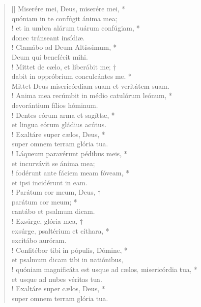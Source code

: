 \begin{verse}[\versewidth]
Miserére mei, Deus, miserére mei, *\\
quóniam in te confúgit ánima mea;\\!
\vin et in umbra alárum tuárum confúgiam, *\\
\vin donec tránseant insídiæ.\\!
Clamábo ad Deum Altíssimum, *\\
Deum qui benefécit mihi.\\!
\vin Mittet de cælo, et liberábit me; †\\
\vin dabit in oppróbrium conculcántes me. *\\
\vin Mittet Deus misericórdiam suam et veritátem suam.\\!
Anima mea recúmbit in médio catulórum leónum, *\\
devorántium fílios hóminum.\\!
\vin Dentes eórum arma et sagíttæ, *\\
\vin et lingua eórum gládius acútus.\\!
Exaltáre super cælos, Deus, *\\
super omnem terram glória tua.\\!
\vin Láqueum paravérunt pédibus meis, *\\
\vin et incurvávit se ánima mea;\\!
fodérunt ante fáciem meam fóveam, *\\
et ipsi incidérunt in eam.\\!
\vin Parátum cor meum, Deus, †\\
\vin parátum cor meum; *\\
\vin cantábo et psalmum dicam.\\!
Exsúrge, glória mea, †\\
exsúrge, psaltérium et cíthara, *\\
excitábo auróram.\\!
\vin Confitébor tibi in pópulis, Dómine, *\\
\vin et psalmum dicam tibi in natiónibus,\\!
quóniam magnificáta est usque ad cælos, misericórdia tua, *\\
et usque ad nubes véritas tua.\\!
\vin Exaltáre super cælos, Deus, *\\
\vin super omnem terram glória tua.\\
\end{verse}
\vspace{1cm}


